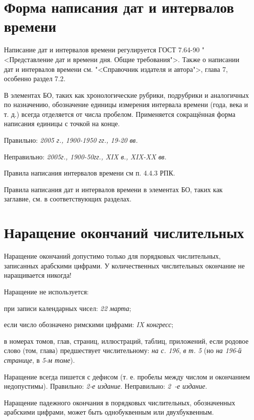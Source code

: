 \section{Форма написания дат и интервалов времени}

Написание дат и интервалов времени регулируется ГОСТ 7.64-90 "<Представление дат и времени дня. Общие требования">. Также о написании дат и интервалов времени см. "<Справочник издателя и автора">, глава 7, особенно раздел 7.2.

В элементах БО, таких как хронологические рубрики, подрубрики и аналогичных по назначению, обозначение единицы измерения интервала времени (года, века и т. д.) всегда отделяется от числа пробелом. Применяется сокращённая форма написания единицы с точкой на конце.

Правильно: \emph{2005 г., 1900-1950 гг., 19-20 вв.}

Неправильно: \emph{2005г., 1900-50гг., XIX в., XIX-XX вв.}

Правила написания интервалов времени см п. 4.4.3 РПК.

Правила написания дат и интервалов времени в элементах БО, таких как заглавие, см. в соответствующих разделах.

\section{Наращение окончаний числительных}

Наращение окончаний допустимо только для порядковых числительных, записанных арабскими цифрами. У количественных числительных окончание не наращивается никогда!

Наращение не используется:

\begin{cutelist}
    \item при записи календарных чисел: \emph{22 марта};
    \item если число обозначено римскими цифрами: \emph{IX конгресс};
    \item в номерах томов, глав, страниц, иллюстраций, таблиц, приложений, если родовое слово (том, глава) предшествует числительному: \emph{на с. 196}, \emph{в т. 5} (но \emph{на 196-й странице}, в \emph{5-м томе}).
\end{cutelist}

Наращение всегда пишется с дефисом (т. е. пробелы между числом и окончанием недопустимы). Правильно: \emph{2-е издание}. Неправильно: \emph{2~-е издание}.

Наращение падежного окончания в порядковых числительных, обозначенных арабскими цифрами, может быть однобуквенным или двухбуквенным.

